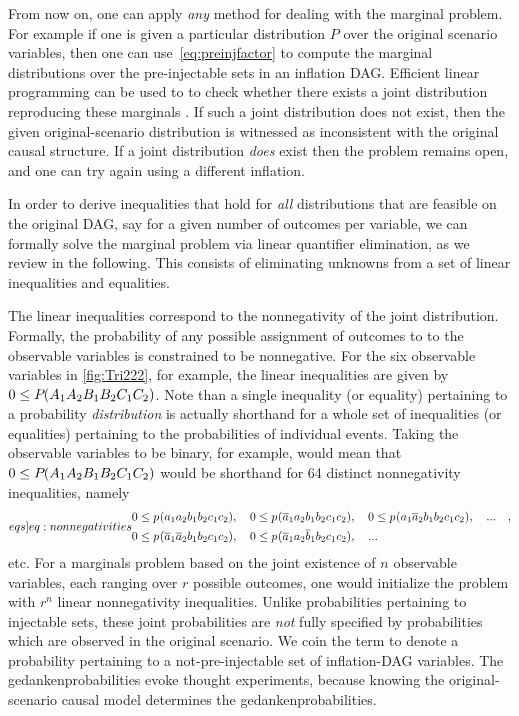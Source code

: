 
From now on, one can apply \emph{any} method for dealing with the marginal problem. For example if one is given a particular distribution $P$ over the original scenario variables, then one can use~\cref{eq:preinjfactor} to compute the marginal distributions over the pre-injectable sets in an inflation DAG. Efficient linear programming can be used to to check whether there exists a joint distribution reproducing these marginals \cite{Korovin2012ImplementingCRA,Bobot2012SimplexSAT}. If such a joint distribution does not exist, then the given original-scenario distribution is witnessed as inconsistent with the original causal structure. If a joint distribution \emph{does} exist then the problem remains open, and one can try again using a different inflation.

In order to derive inequalities that hold for \emph{all} distributions that are feasible on the original DAG, say for a given number of outcomes per variable, we can formally solve the marginal problem via linear quantifier elimination, as we review in the following. This consists of eliminating unknowns from a set of linear inequalities and equalities.

The linear inequalities correspond to the nonnegativity of the joint distribution. Formally, the probability of any possible assignment of outcomes to to the observable variables is constrained to be nonnegative. For the six observable variables in \cref{fig:Tri222}, for example, the linear inequalities are given by $0\leq {P_{}}\lparen A_1 A_2 B_1 B_2 C_1 C_2\rparen$. Note than a single inequality (or equality) pertaining to a probability \emph{distribution} is actually shorthand for a whole set of inequalities (or equalities) pertaining to the probabilities of individual events. Taking the observable variables to be binary, for example, would mean that $0\leq {P_{}}\lparen A_1 A_2 B_1 B_2 C_1 C_2\rparen$ would be shorthand for 64 distinct nonnegativity inequalities, namely
\begin{align}\label[eqs]{eq:nonnegativities}
\begin{split}
 & 0\leq \p{a_1 a_2 b_1 b_2 c_1 c_2} ,\quad
 0\leq \p{\n{a}_1 a_2 b_1 b_2 c_1 c_2} ,\quad
 0\leq \p{a_1 \n{a}_2 b_1 b_2 c_1 c_2} ,\quad...\quad,\\
 &
 0\leq \p{\n{a}_1 \n{a}_2 b_1 b_2 c_1 c_2} ,\quad
 0\leq \p{\n{a}_1 a_2 \n{b}_1 b_2 c_1 c_2}, \quad ...
\end{split}
\end{align}
etc. For a marginals problem based on the joint existence of $n$ observable variables, each ranging over $r$ possible outcomes, one would initialize the problem with $r^n$ linear nonnegativity inequalities. Unlike probabilities pertaining to injectable sets, these joint probabilities are \emph{not} fully specified by probabilities which are observed in the original scenario. We coin the term  to denote a probability pertaining to a not-pre-injectable set of inflation-DAG variables. The gedankenprobabilities evoke thought experiments, because knowing the original-scenario causal model determines the gedankenprobabilities. %

